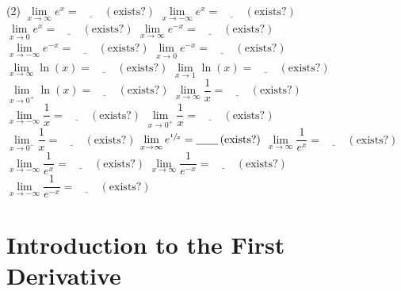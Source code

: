 \documentclass[10pt,oneside,]{book}
\theoremstyle{plain}
\theoremstyle{definition}
\numberwithin{equation}{section}
\newcommand{\fe}[2]{#1\mathopen{}\left(#2\right)\mathclose{}}
\begin{document}
\begin{exercisegroup}(2)
\exercise[24.]\hypertarget{exercise-160}{\null}\(\lim\limits_{x\to\infty}e^x=\underline{\qquad}\,(\text{exists?})\)%
\exercise[25.]\hypertarget{exercise-161}{\null}\(\lim\limits_{x\to-\infty}e^x=\underline{\qquad}\,(\text{exists?})\)%
\exercise[26.]\hypertarget{exercise-162}{\null}\(\lim\limits_{x\to0}e^x=\underline{\qquad}\,(\text{exists?})\)%
\exercise[27.]\hypertarget{exercise-163}{\null}\(\lim\limits_{x\to\infty}e^{-x}=\underline{\qquad}\,(\text{exists?})\)%
\exercise[28.]\hypertarget{exercise-164}{\null}\(\lim\limits_{x\to-\infty}e^{-x}=\underline{\qquad}\,(\text{exists?})\)%
\exercise[29.]\hypertarget{exercise-165}{\null}\(\lim\limits_{x\to0}e^{-x}=\underline{\qquad}\,(\text{exists?})\)%
\exercise[30.]\hypertarget{exercise-166}{\null}\(\lim\limits_{x\to\infty}\fe{\ln}{x}=\underline{\qquad}\,(\text{exists?})\)%
\exercise[31.]\hypertarget{exercise-167}{\null}\(\lim\limits_{x\to1}\fe{\ln}{x}=\underline{\qquad}\,(\text{exists?})\)%
\exercise[32.]\hypertarget{exercise-168}{\null}\(\lim\limits_{x\to0^{+}}\fe{\ln}{x}=\underline{\qquad}\,(\text{exists?})\)%
\exercise[33.]\hypertarget{exercise-169}{\null}\(\lim\limits_{x\to\infty}\dfrac{1}{x}=\underline{\qquad}\,(\text{exists?})\)%
\exercise[34.]\hypertarget{exercise-170}{\null}\(\lim\limits_{x\to-\infty}\dfrac{1}{x}=\underline{\qquad}\,(\text{exists?})\)%
\exercise[35.]\hypertarget{exercise-171}{\null}\(\lim\limits_{x\to0^{+}}\dfrac{1}{x}=\underline{\qquad}\,(\text{exists?})\)%
\exercise[36.]\hypertarget{exercise-172}{\null}\(\lim\limits_{x\to0^{-}}\dfrac{1}{x}=\underline{\qquad}\,(\text{exists?})\)%
\exercise[37.]\hypertarget{exercise-173}{\null}\(\lim\limits_{x\to\infty}e^{\sfrac{1}{x}}=\underline{\qquad}\,(\text{exists?})\)%
\exercise[38.]\hypertarget{exercise-174}{\null}\(\lim\limits_{x\to\infty}\dfrac{1}{e^x}=\underline{\qquad}\,(\text{exists?})\)%
\exercise[39.]\hypertarget{exercise-175}{\null}\(\lim\limits_{x\to-\infty}\dfrac{1}{e^x}=\underline{\qquad}\,(\text{exists?})\)%
\exercise[40.]\hypertarget{exercise-176}{\null}\(\lim\limits_{x\to\infty}\dfrac{1}{e^{-x}}=\underline{\qquad}\,(\text{exists?})\)%
\exercise[41.]\hypertarget{exercise-177}{\null}\(\lim\limits_{x\to-\infty}\dfrac{1}{e^{-x}}=\underline{\qquad}\,(\text{exists?})\)%
\end{exercisegroup}
\par\smallskip\noindent
\typeout{************************************************}
\typeout{************************************************}
\chapter[Introduction to the First Derivative]{Introduction to the First Derivative}\label{chapter-introduction-first-derivative}
\typeout{************************************************}
\typeout{************************************************}
\end{document}

